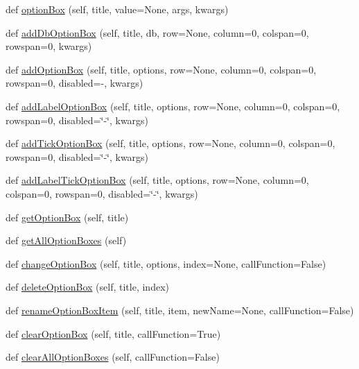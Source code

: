 \begin{DoxyCompactItemize}
\item 
def \hyperlink{classappjar_1_1gui_a1e6823f3213d880cd6d4218757f4f617}{option\+Box} (self, title, value=None, args, kwargs)
\item 
def \hyperlink{classappjar_1_1gui_ad4bee7fc1c236d3b317fa2873900ab49}{add\+Db\+Option\+Box} (self, title, db, row=None, column=0, colspan=0, rowspan=0, kwargs)
\item 
def \hyperlink{classappjar_1_1gui_ae354fdda13178fe687c65d4c5d0fa33d}{add\+Option\+Box} (self, title, options, row=None, column=0, colspan=0, rowspan=0, disabled=\textquotesingle{}-\/\textquotesingle{}, kwargs)
\item 
def \hyperlink{classappjar_1_1gui_a53643139f8d07a9a43d7aafee7d6337e}{add\+Label\+Option\+Box} (self, title, options, row=None, column=0, colspan=0, rowspan=0, disabled=\char`\"{}-\/\char`\"{}, kwargs)
\item 
def \hyperlink{classappjar_1_1gui_ab439d49f6c4be161345abf4fd11dd0c5}{add\+Tick\+Option\+Box} (self, title, options, row=None, column=0, colspan=0, rowspan=0, disabled=\char`\"{}-\/\char`\"{}, kwargs)
\item 
def \hyperlink{classappjar_1_1gui_a6a0bbd621cd1535852a1d8957385a7bb}{add\+Label\+Tick\+Option\+Box} (self, title, options, row=None, column=0, colspan=0, rowspan=0, disabled=\char`\"{}-\/\char`\"{}, kwargs)
\item 
def \hyperlink{classappjar_1_1gui_abacd02677277cb43514dcf2298ac3674}{get\+Option\+Box} (self, title)
\item 
def \hyperlink{classappjar_1_1gui_a777776f85e235610df69054ed7940d4f}{get\+All\+Option\+Boxes} (self)
\item 
def \hyperlink{classappjar_1_1gui_a974171d577bb5819246fb5c15c1e4fa8}{change\+Option\+Box} (self, title, options, index=None, call\+Function=False)
\item 
def \hyperlink{classappjar_1_1gui_ab62464e72a72f5159c279f1218a2a447}{delete\+Option\+Box} (self, title, index)
\item 
def \hyperlink{classappjar_1_1gui_aa09c49e2dc870f5d9a27898b1076e5fc}{rename\+Option\+Box\+Item} (self, title, item, new\+Name=None, call\+Function=False)
\item 
def \hyperlink{classappjar_1_1gui_a0db4ea223b08f1db3925b7b42c324de7}{clear\+Option\+Box} (self, title, call\+Function=True)
\item 
def \hyperlink{classappjar_1_1gui_ad3b5d57b67377d99154cdc9e9e07e798}{clear\+All\+Option\+Boxes} (self, call\+Function=False)
\item 

\end{DoxyCompactItemize}
